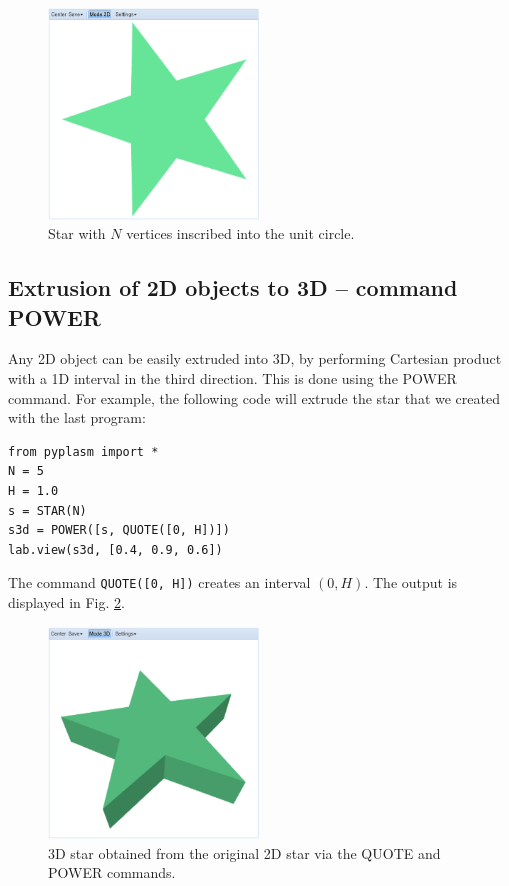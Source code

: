 \documentclass[article,A4,12pt]{llncs}
\begin{document}
\begin{figure}[!ht]
\begin{center}
\includegraphics[width=0.5\textwidth]{img/star-1.png}
\end{center}
\vspace{-2mm}
\caption{Star with $N$ vertices inscribed into the unit circle.}
\label{fig:star-1}
\end{figure}

\subsection{Extrusion of 2D objects to 3D -- command POWER}

Any 2D object can be easily extruded into 3D, by performing 
Cartesian product with a 1D interval in the third direction. This 
is done using the POWER command. For example, the following code will
extrude the star that we created with the last program:

\begin{verbatim}
from pyplasm import *
N = 5
H = 1.0
s = STAR(N)
s3d = POWER([s, QUOTE([0, H])])
lab.view(s3d, [0.4, 0.9, 0.6])
\end{verbatim}
The command {\tt QUOTE([0, H])} creates an interval $(0, H)$. 
The output is displayed in Fig. \ref{fig:star-2}.

\newpage

\begin{figure}[!ht]
\begin{center}
\includegraphics[width=0.5\textwidth]{img/star-2.png}
\end{center}
\vspace{-2mm}
\caption{3D star obtained from the original 2D star via the QUOTE and POWER commands.}
\label{fig:star-2}
\end{figure}
\end{document}
